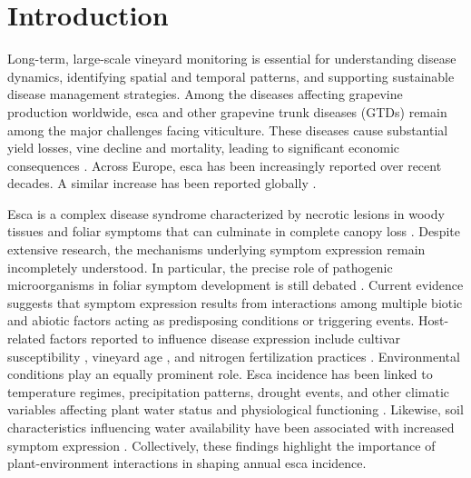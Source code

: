 \section{Introduction}\label{sec:introduction}

Long-term, large-scale vineyard monitoring is essential for understanding disease dynamics, identifying spatial and temporal patterns, and supporting sustainable disease management strategies. Among the diseases affecting grapevine production worldwide, esca and other grapevine trunk diseases (GTDs) remain among the major challenges facing viticulture. These diseases cause substantial yield losses, vine decline and mortality, leading to significant economic consequences \citep{bertsch_grapevine_2013,gramaje_managing_2018,hofstetter_what_2012}. Across Europe, esca has been increasingly reported over recent decades. \citep{bruez_overview_2012,dewasme_long-term_2022,etienne_exploring_2024} A similar increase has been reported globally \citep{kenfaoui_panoramic_2022}.

Esca is a complex disease syndrome characterized by necrotic lesions in woody tissues and foliar symptoms that can culminate in complete canopy loss \citep{fischer_grapevine_2019,ouadi_ecophysiological_2019}. Despite extensive research, the mechanisms underlying symptom expression remain incompletely understood. In particular, the precise role of pathogenic microorganisms in foliar symptom development is still debated \citep{bruez_major_2020,del_frari_characterization_2019,monod_landscape-scale_2025}. Current evidence suggests that symptom expression results from interactions among multiple biotic and abiotic factors acting as predisposing conditions or triggering events. Host-related factors reported to influence disease expression include cultivar susceptibility \citep{chacon-vozmediano_cultivar_2021,gastou_large_2024,guerin-dubrana_grapevine_2019}, vineyard age \citep{etienne_exploring_2024,fussler_characterization_2008}, and nitrogen fertilization practices \citep{dellacqua_nitrogen_2025}. Environmental conditions play an equally prominent role. Esca incidence has been linked to temperature regimes, precipitation patterns, drought events, and other climatic variables affecting plant water status and physiological functioning \citep{bortolami_grapevines_2021,calzarano_rainfall_2018,serra_expression_2018,surico_epidemiology_2000}. Likewise, soil characteristics influencing water availability have been associated with increased symptom expression \citep{monod_identifying_2025}. Collectively, these findings highlight the importance of plant-environment interactions in shaping annual esca incidence.

